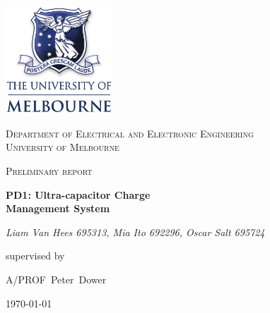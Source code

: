 \documentclass[12pt]{article}
\numberwithin{equation}{section}
\numberwithin{figure}{section}
\begin{document}
\begin{titlepage}
	\centering
	\vspace{2cm}
	\includegraphics[width=0.3\textwidth]{figures/unilogo.pdf}\par\vspace{1cm}
	{\scshape\large Department of Electrical and Electronic Engineering \\  University of Melbourne\par}
	\vspace{0.5cm}
	{\scshape\Large Preliminary report\par}
	\vspace{1cm}
	{\huge\bfseries PD1: Ultra-capacitor Charge \\ Management System\par}
	\vspace{4cm}
	{\large\itshape Liam Van Hees 695313, Mia Ito 692296, Oscar Salt 695724\par}
	\vfill
	supervised by\par
	A/PROF~Peter~Dower
	\vfill
	{\large \today\par}
\end{titlepage}
\end{document}

